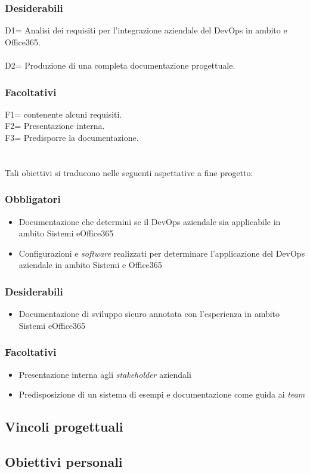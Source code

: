 \subsubsection*{Desiderabili}
D1= Analisi dei requisiti per l'integrazione aziendale del \gls{DevOps} in ambito  e Office365.\\\\
D2= Produzione di una completa documentazione progettuale.\\
\subsubsection*{Facoltativi}
F1=  contenente alcuni requisiti.\\
F2= Presentazione interna.\\
F3= Predisporre la documentazione.\\\\\\
Tali obiettivi si traducono nelle seguenti aspettative a fine progetto: 
\subsubsection*{Obbligatori}
\begin{itemize}
    \item Documentazione che determini se il \gls{DevOps} aziendale sia applicabile in ambito \gls{Sistemi} eOffice365
    \item Configurazioni e \emph{software} realizzati per determinare l'applicazione del \gls{DevOps} aziendale in ambito \gls{Sistemi} e Office365
\end{itemize}
\subsubsection*{Desiderabili}
\begin{itemize}
    \item Documentazione di sviluppo sicuro annotata con l'esperienza in ambito \gls{Sistemi} eOffice365
\end{itemize}
\subsubsection*{Facoltativi}
\begin{itemize}
    \item Presentazione interna agli \emph{stakeholder} aziendali
    \item Predisposizione di un sistema di esempi e documentazione come guida ai \emph{team}
\end{itemize}


\subsection{Vincoli progettuali}


\subsection{Obiettivi personali}
%

